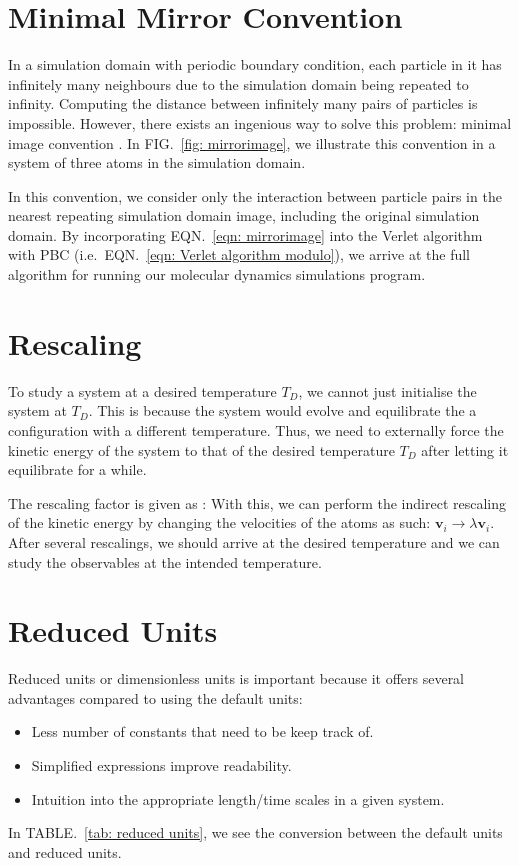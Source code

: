 \documentclass[pra,aps,superscriptaddress,amssymb,amsmath,reprint,noeprint,floatfix]{revtex4-2}
\begin{document}
\section{\label{subsec: Minimal Mirror Convention}Minimal Mirror Convention}
In a simulation domain with periodic boundary condition, each particle in it has infinitely many neighbours due to the simulation domain being repeated to infinity. Computing the distance between infinitely many pairs of particles is impossible. However, there exists an ingenious way to solve this problem: minimal image convention \cite{tudelftnotes}. In FIG.\ \ref{fig: mirrorimage}, we illustrate this convention in a system of three atoms in the simulation domain.
\figmirrorimage

In this convention, we consider only the interaction between particle pairs in the nearest repeating simulation domain image, including the original simulation domain.
\mirrorimage
By incorporating EQN.\ \ref{eqn: mirrorimage} into the Verlet algorithm with PBC (i.e.\ EQN.\ \ref{eqn: Verlet algorithm modulo}), we arrive at the full algorithm for running our molecular dynamics simulations program.

\section{\label{subsec: Rescaling}Rescaling}
To study a system at a desired temperature $T_D$, we cannot just initialise the system at $T_D$. This is because the system would evolve and equilibrate the a configuration with a different temperature. Thus, we need to externally force the kinetic energy of the system to that of the desired temperature $T_D$ after letting it equilibrate for a while.

The rescaling factor is given as \cite{tudelftnotes}:
\rescaling
With this, we can perform the indirect rescaling of the kinetic energy by changing the velocities of the atoms as such: $\mathbf{v}_i\rightarrow\lambda\mathbf{v}_i$. After several rescalings, we should arrive at the desired temperature and we can study the observables at the intended temperature.

\section{\label{subsec: Reduced Units}Reduced Units}
Reduced units or dimensionless units is important because it offers several advantages compared to using the default units:
\begin{itemize}
\item Less number of constants that need to be keep track of.
\item Simplified expressions improve readability.
\item Intuition into the appropriate length/time scales in a given system.
\end{itemize}
In TABLE.\ \ref{tab: reduced units}, we see the conversion between the default units and reduced units.
\tabreducedunits
\end{document}
